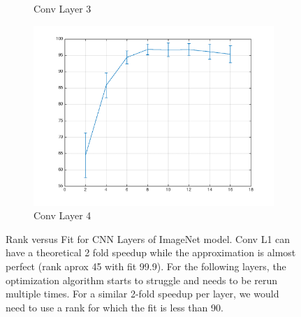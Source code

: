 \begin{figure}[!htb]
\begin{subfigure}[h]{0.40\textwidth}
    \caption{Conv Layer 3}
  \end{subfigure}
  \begin{subfigure}[h]{0.40\textwidth}
    \includegraphics[width=\textwidth]{images/Layer4ImageNet.png}
    \caption{Conv Layer 4}
  \end{subfigure}
  \caption{Rank versus Fit for CNN Layers of ImageNet model. Conv L1 can have a theoretical 2 fold speedup while the approximation is almost perfect (rank aprox 45 with fit 99.9). For the following layers, the optimization algorithm starts to struggle and needs to be rerun multiple times. For a similar 2-fold speedup per layer, we would need to use a rank for which the fit is less than 90.}
  \label{fig:user_artiststribution}
\end{figure}